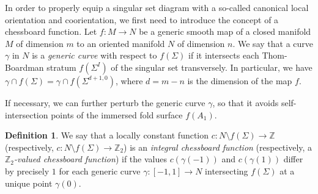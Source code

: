 \documentclass[12pt]{amsart}
\def \R{\mathbb{R}}
\def \Z{\mathbb{Z}}
\def\co{\colon}
\theoremstyle{definition}
\newtheorem{definition}[theorem]{Definition}
\begin{document}
In order to properly equip a singular set diagram with a so-called canonical local orientation and coorientation, we first need to introduce the concept of a chessboard function. Let $f\co M\to N$ be a generic smooth map of a closed manifold $M$ of dimension $m$ to an oriented manifold $N$ of dimension $n$. We say that a curve $\gamma$ in $N$ is a \emph{generic curve} with respect to $f(\Sigma)$ if it intersects each Thom-Boardman stratum $f(\Sigma^I)$ of the singular set transversely.  In particular, we have $\gamma\cap f(\Sigma)=\gamma\cap f(\Sigma^{d+1,0})$,  where $d=m-n$ is the dimension of the map $f$. 

 
If necessary,  we can further perturb the generic curve $\gamma$, so that it avoids self-intersection points of the immersed fold surface $f(A_1)$. 
\begin{definition}
We say that a locally constant function $c: N\setminus f(\Sigma) \rightarrow \Z$ (respectively, $c: N\setminus f(\Sigma) \rightarrow \Z_2$) is an \emph{integral chessboard function} (respectively, a \emph{$\Z_2$-valued chessboard function}) if the values $c(\gamma(-1))$ and $c(\gamma(1))$ differ by precisely $1$  for each generic curve $\gamma\co [-1, 1]\to N$ intersecting $f(\Sigma)$ at a unique point $\gamma(0)$. 
\end{definition}
\end{document}
